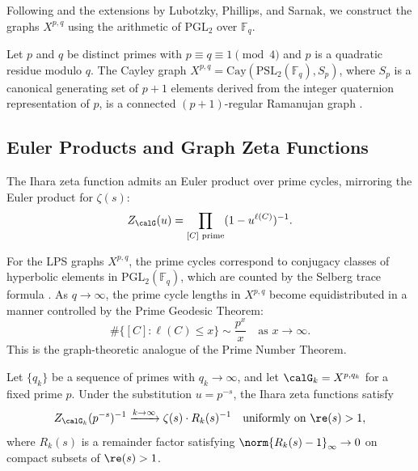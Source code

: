 \documentclass[12pt, a4paper]{article}
\theoremstyle{plain}
\theoremstyle{definition}
\begin{document}
Following \citet{Selberg1956} and the extensions by Lubotzky, Phillips, and
Sarnak, we construct the graphs $X^{p,q}$ using the arithmetic of
$\mathrm{PGL}_2$ over $\mathbb{F}_q$.

\begin{construction}\label{con:LPS}
  Let $p$ and $q$ be distinct primes with $p \equiv q \equiv 1 \pmod 4$
  and $p$ is a quadratic residue modulo $q$. The Cayley graph
  $X^{p,q} = \mathrm{Cay}(\mathrm{PSL}_2(\mathbb{F}_q), S_p)$, where
  $S_p$ is a canonical generating set of $p+1$ elements derived from
  the integer quaternion representation of $p$, is a connected
  $(p+1)$-regular Ramanujan graph \citep{Selberg1956}.
\end{construction}

\subsection{Euler Products and Graph Zeta Functions}

The Ihara zeta function admits an Euler product over prime cycles, mirroring
the Euler product for $\zeta(s)$:
\begin{equation}\label{eq:euler_ihara}
  Z_\calG(u) = \prod_{[C] \text{ prime}} (1 - u^{\ell(C)})^{-1}.
\end{equation}

For the LPS graphs $X^{p,q}$, the prime cycles correspond to conjugacy classes
of hyperbolic elements in $\mathrm{PGL}_2(\mathbb{F}_q)$, which are counted by
the Selberg trace formula \citep{Selberg1956, Hejhal1976}. As $q \to \infty$,
the prime cycle lengths in $X^{p,q}$ become equidistributed in a manner
controlled by the Prime Geodesic Theorem:
\begin{equation}\label{eq:prime_geodesic}
  \#\{[C] : \ell(C) \leq x\} \sim \frac{p^x}{x} \quad \text{as } x \to \infty.
\end{equation}
This is the graph-theoretic analogue of the Prime Number Theorem.

\begin{proposition}\label{prop:euler_conv}
  Let $\{q_k\}$ be a sequence of primes with $q_k \to \infty$, and let
  $\calG_k = X^{p, q_k}$ for a fixed prime $p$. Under the substitution
  $u = p^{-s}$, the Ihara zeta functions satisfy
  \begin{equation}\label{eq:euler_conv}
    Z_{\calG_k}(p^{-s})^{-1} \xrightarrow{k \to \infty} \zeta(s) \cdot R_k(s)^{-1}
    \quad \text{uniformly on } \re(s) > 1,
  \end{equation}
  where $R_k(s)$ is a remainder factor satisfying $\norm{R_k(s) - 1}_\infty \to 0$
  on compact subsets of $\re(s) > 1$.
\end{proposition}
\end{document}
